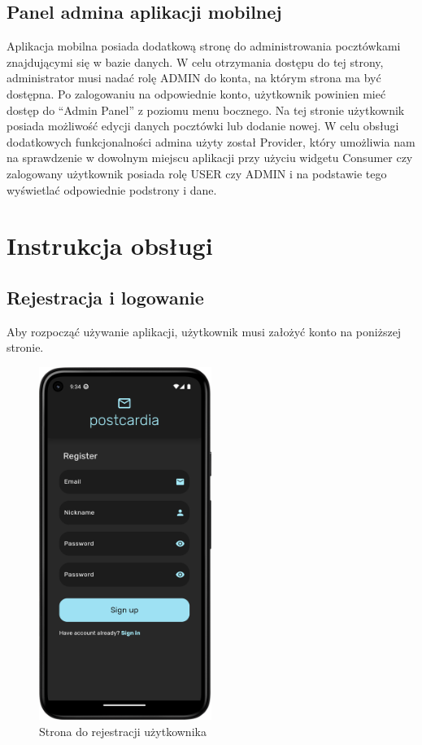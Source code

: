 \documentclass[a4paper,twoside,12pt]{book}
\begin{document}
\subsection{Panel admina aplikacji mobilnej}

Aplikacja mobilna posiada dodatkową stronę do administrowania pocztówkami znajdującymi się w bazie danych. W celu otrzymania dostępu do tej strony, administrator musi nadać rolę ADMIN do konta, na którym strona ma być dostępna. Po zalogowaniu na odpowiednie konto, użytkownik powinien mieć dostęp do ``Admin Panel'' z poziomu menu bocznego. 
Na tej stronie użytkownik posiada możliwość edycji danych pocztówki lub dodanie nowej. W celu obsługi dodatkowych funkcjonalności admina użyty został Provider, który umożliwia nam na sprawdzenie w dowolnym miejscu aplikacji przy użyciu widgetu Consumer czy zalogowany użytkownik posiada rolę USER czy ADMIN i na podstawie tego wyświetlać odpowiednie podstrony i dane.

\section{Instrukcja obsługi}

\subsection{Rejestracja i logowanie}
Aby rozpocząć używanie aplikacji, użytkownik musi założyć konto na poniższej stronie.
\begin{figure}[H]
    \centering
    \includegraphics[width=0.5\textwidth]{mobile_ss/rejestracja.png}
    \caption{Strona do rejestracji użytkownika}
\end{figure}
\end{document}
